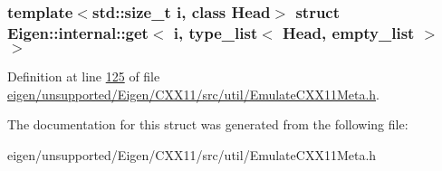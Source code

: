 \subsubsection*{template$<$std\+::size\+\_\+t i, class Head$>$\newline
struct Eigen\+::internal\+::get$<$ i, type\+\_\+list$<$ Head, empty\+\_\+list $>$ $>$}



Definition at line \hyperlink{eigen_2unsupported_2_eigen_2_c_x_x11_2src_2util_2_emulate_c_x_x11_meta_8h_source_l00125}{125} of file \hyperlink{eigen_2unsupported_2_eigen_2_c_x_x11_2src_2util_2_emulate_c_x_x11_meta_8h_source}{eigen/unsupported/\+Eigen/\+C\+X\+X11/src/util/\+Emulate\+C\+X\+X11\+Meta.\+h}.



The documentation for this struct was generated from the following file\+:\begin{DoxyCompactItemize}
\item 
eigen/unsupported/\+Eigen/\+C\+X\+X11/src/util/\+Emulate\+C\+X\+X11\+Meta.\+h\end{DoxyCompactItemize}
